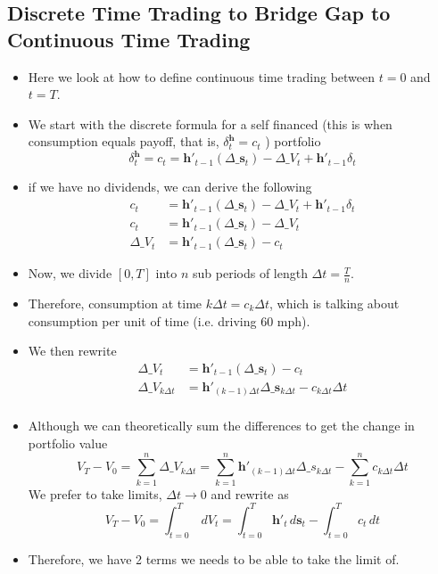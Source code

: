 \documentclass[11pt]{article}
\begin{document}
\subsection{Discrete Time Trading to Bridge Gap to Continuous Time Trading}
\begin{itemize}
    \item Here we look at how to define continuous time trading between $t=0$ and $t=T$.
    \item We start with the discrete formula for a self financed (this is when consumption 
    equals payoff, that is, $\delta_t^{\boldsymbol{h}} = c_t$ ) portfolio
    \[ \delta_t^{\boldsymbol{h}} = c_t = \boldsymbol{h}'_{t-1}(\Delta\_\boldsymbol{s}_t) - 
    \Delta \_ V_t + \boldsymbol{h}'_{t-1} \delta_t \]
    \item if we have no dividends, we can derive the following
    \begin{align*}
        c_t &= \boldsymbol{h}'_{t-1}(\Delta\_\boldsymbol{s}_t) - \Delta \_ V_t + 
        \boldsymbol{h}'_{t-1} \delta_t \\
        c_t &= \boldsymbol{h}'_{t-1}(\Delta\_\boldsymbol{s}_t) - \Delta \_ V_t \\
        \Delta \_ V_t &= \boldsymbol{h}'_{t-1}(\Delta\_\boldsymbol{s}_t) - c_t
    \end{align*}
    \item Now, we divide $[0,T]$ into $n$ sub periods of length $\Delta t = \frac{T}{n}$.
    \item Therefore, consumption at time $k \Delta t =  c_k \Delta t$, which is talking about 
    consumption per unit of time (i.e. driving 60 mph).
    \item We then rewrite
    \begin{align*}
        \Delta \_ V_t &= \boldsymbol{h}'_{t-1}(\Delta\_\boldsymbol{s}_t) - c_t \\
        \Delta \_ V_{k \Delta t} &= \boldsymbol{h}'_{(k-1)\Delta t}\Delta\_
        \boldsymbol{s}_{k \Delta t} - c_{k \Delta t} \Delta t \\
    \end{align*}
    \item Although we can theoretically sum the differences to get the change in portfolio 
    value 
    \[ 
    V_T - V_0 = \sum_{k=1}^{n}\Delta \_ V_{k\Delta t}
    = \sum_{k=1}^{n}\boldsymbol{h}'_{(k-1)\Delta t} \Delta \_ s_{k \Delta t} - 
    \sum_{k=1}^{n} c_{k \Delta t} \Delta t
    \]
    We prefer to take limits, $\Delta t \rightarrow 0$ and rewrite as 
    \[
    V_T - V_0 = \int_{t=0}^{T}\, dV_t 
    = \int_{t=0}^{T}\boldsymbol{h}'_t \, d\boldsymbol{s}_t - \int_{t=0}^{T} c_t \, dt
    \]
    \item Therefore, we have 2 terms we needs to be able to take the limit of.
\end{itemize}
\end{document}
